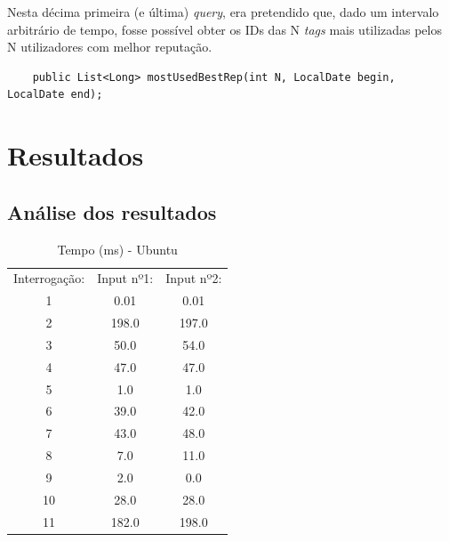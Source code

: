 \documentclass[a4paper, 11pt, oneside]{article}
\begin{document}
Nesta décima primeira (e última) \textit{query}, era pretendido que, dado um intervalo arbitrário de tempo, fosse possível obter os IDs das N \textit{tags} mais 
utilizadas pelos N utilizadores com melhor reputação.

\begin{lstlisting}
	public List<Long> mostUsedBestRep(int N, LocalDate begin, LocalDate end);
\end{lstlisting}







\section{Resultados}

\subsection{Análise dos resultados}

\begin{table}[h] 
	\centering
	\caption{Tempo (ms) - Ubuntu}	
	\begin{tabular}{c|c|c}
	Interrogação: & Input nº1:      & Input nº2:      \\
	1             & 0.01            & 0.01            \\
	2             & 198.0           & 197.0           \\
	3             & 50.0            & 54.0            \\
	4             & 47.0            & 47.0            \\
	5             & 1.0             & 1.0             \\
	6             & 39.0            & 42.0            \\
	7             & 43.0            & 48.0            \\
	8             & 7.0             & 11.0            \\
	9             & 2.0             & 0.0             \\
	10            & 28.0            & 28.0            \\
	11            & 182.0           & 198.0  
	\end{tabular}
\end{table}
\end{document}
